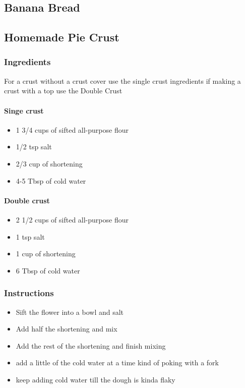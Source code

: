 \documentclass[11pt]{article}
\begin{document}
\subsection{Banana Bread}
\label{sec:org194c5f7}
\subsection{Homemade Pie Crust}
\label{sec:orgce50236}
\subsubsection*{Ingredients}
\label{sec:org5eb42db}
For a crust without a crust cover use the single crust ingredients if making a crust with a top use the Double Crust
\paragraph*{Singe crust}
\label{sec:orgb018a50}
\begin{itemize}
\item 1 3/4 cups of sifted all-purpose flour
\item 1/2 tsp salt
\item 2/3 cup of shortening
\item 4-5 Tbsp of cold water
\end{itemize}
\paragraph*{Double crust}
\label{sec:orgf797a98}
\begin{itemize}
\item 2 1/2 cups of sifted all-purpose flour
\item 1 tsp salt
\item 1 cup of shortening
\item 6 Tbsp of cold water
\end{itemize}
\subsubsection*{Instructions}
\label{sec:orgbe261bf}
\begin{itemize}
\item Sift the flower into a bowl and salt
\item Add half the shortening and mix
\item Add the rest of the shortening and finish mixing
\item add a little of the cold water at a time kind of poking with a fork
\item keep adding cold water till the dough is kinda flaky
\end{itemize}
\end{document}
